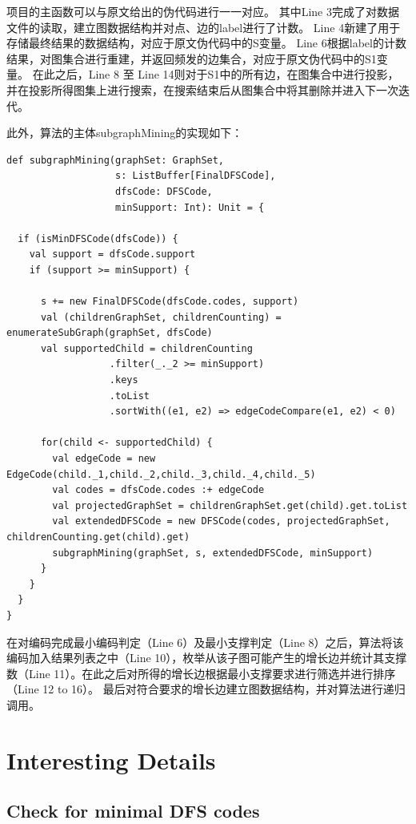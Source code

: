 \documentclass{article}
\begin{document}
项目的主函数可以与原文给出的伪代码进行一一对应。
其中Line 3完成了对数据文件的读取，建立图数据结构并对点、边的label进行了计数。
Line 4新建了用于存储最终结果的数据结构，对应于原文伪代码中的S变量。
Line 6根据label的计数结果，对图集合进行重建，并返回频发的边集合，对应于原文伪代码中的S1变量。
在此之后，Line 8 至 Line 14则对于S1中的所有边，在图集合中进行投影，并在投影所得图集上进行搜索，在搜索结束后从图集合中将其删除并进入下一次迭代。

此外，算法的主体subgraphMining的实现如下：
\begin{lstlisting}[style=mStyle]
def subgraphMining(graphSet: GraphSet, 
                   s: ListBuffer[FinalDFSCode], 
                   dfsCode: DFSCode, 
                   minSupport: Int): Unit = {

  if (isMinDFSCode(dfsCode)) {
    val support = dfsCode.support
    if (support >= minSupport) {

      s += new FinalDFSCode(dfsCode.codes, support)
      val (childrenGraphSet, childrenCounting) = enumerateSubGraph(graphSet, dfsCode)
      val supportedChild = childrenCounting
                  .filter(_._2 >= minSupport)
                  .keys
                  .toList
                  .sortWith((e1, e2) => edgeCodeCompare(e1, e2) < 0)

      for(child <- supportedChild) {
        val edgeCode = new EdgeCode(child._1,child._2,child._3,child._4,child._5)
        val codes = dfsCode.codes :+ edgeCode
        val projectedGraphSet = childrenGraphSet.get(child).get.toList
        val extendedDFSCode = new DFSCode(codes, projectedGraphSet, childrenCounting.get(child).get)
        subgraphMining(graphSet, s, extendedDFSCode, minSupport)
      }
    }
  }
}
\end{lstlisting}

在对编码完成最小编码判定（Line 6）及最小支撑判定（Line 8）之后，算法将该编码加入结果列表之中（Line 10），枚举从该子图可能产生的增长边并统计其支撑数（Line 11）。在此之后对所得的增长边根据最小支撑要求进行筛选并进行排序（Line 12 to 16）。
最后对符合要求的增长边建立图数据结构，并对算法进行递归调用。

\section{Interesting Details}

\subsection{Check for minimal DFS codes}
\end{document}
